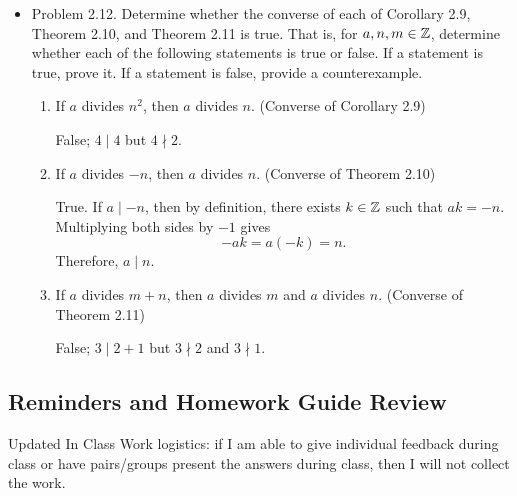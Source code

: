 \documentclass{ximera}
\begin{document}
\begin{pre}
\begin{itemize}
 \item Problem 2.12. Determine whether the converse of each of Corollary 2.9, Theorem 2.10, and Theorem 2.11 is true. That is, for $a,n,m\in\mathbb Z$, determine whether each of the following statements is true or false. If a statement is true, prove it. If a statement is false, provide a counterexample.
  \begin{enumerate}%
\item  If $a$ divides $n^2$, then $a$ divides $n$. (Converse of Corollary 2.9)
\begin{solution}
 False; $4\mid 4$ but $4\nmid 2$.
\end{solution}
\item If $a$ divides $-n$, then $a$ divides $n$. (Converse of Theorem 2.10)
\begin{solution}
 True. If $a\mid -n$, then by definition, there exists $k\in\mathbb Z$ such that $ak=-n$. Multiplying both sides by $-1$ gives \[-ak=a(-k)=n.\] Therefore, $a\mid n$.
\end{solution}
\item If $a$ divides $m+n$, then $a$ divides $m$ and $a$ divides $n$.
 (Converse of Theorem 2.11)
 
\begin{solution}
 False; $3\mid 2+1$ but $3\nmid 2$ and $3\nmid 1$.
\end{solution}
\end{enumerate}
\end{itemize}
\end{pre}


\subsection{Reminders and Homework Guide Review}%
Updated In Class Work logistics: if I am able to give individual feedback during class or have pairs/groups present the answers during class, then I will not collect the work. 
\end{document}
